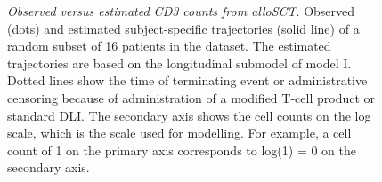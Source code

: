 \documentclass[
  letterpaper,
  DIV=11,
  numbers=noendperiod]{scrreprt}
\begin{document}
\begin{figure}


\caption{\label{fig-DLI-two}\emph{Observed versus estimated CD3 counts
from alloSCT}. Observed (dots) and estimated subject-specific
trajectories (solid line) of a random subset of 16 patients in the
dataset. The estimated trajectories are based on the longitudinal
submodel of model I. Dotted lines show the time of terminating event or
administrative censoring because of administration of a modified T-cell
product or standard DLI. The secondary axis shows the cell counts on the
log scale, which is the scale used for modelling. For example, a cell
count of 1 on the primary axis corresponds to log(1) = 0 on the
secondary axis.}

\end{figure}%
\end{document}
